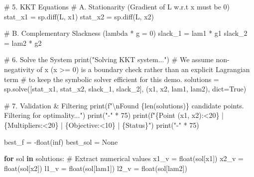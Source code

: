 \documentclass[
  letterpaper,
  DIV=11,
  numbers=noendperiod]{scrreprt}
\newenvironment{Shaded}{\begin{snugshade}}{\end{snugshade}}
\newcommand{\BuiltInTok}[1]{\textcolor[rgb]{0.00,0.23,0.31}{#1}}
\newcommand{\CharTok}[1]{\textcolor[rgb]{0.13,0.47,0.30}{#1}}
\newcommand{\CommentTok}[1]{\textcolor[rgb]{0.37,0.37,0.37}{#1}}
\newcommand{\ControlFlowTok}[1]{\textcolor[rgb]{0.00,0.23,0.31}{\textbf{#1}}}
\newcommand{\DecValTok}[1]{\textcolor[rgb]{0.68,0.00,0.00}{#1}}
\newcommand{\KeywordTok}[1]{\textcolor[rgb]{0.00,0.23,0.31}{\textbf{#1}}}
\newcommand{\NormalTok}[1]{\textcolor[rgb]{0.00,0.23,0.31}{#1}}
\newcommand{\OperatorTok}[1]{\textcolor[rgb]{0.37,0.37,0.37}{#1}}
\newcommand{\SpecialCharTok}[1]{\textcolor[rgb]{0.37,0.37,0.37}{#1}}
\newcommand{\SpecialStringTok}[1]{\textcolor[rgb]{0.13,0.47,0.30}{#1}}
\newcommand{\StringTok}[1]{\textcolor[rgb]{0.13,0.47,0.30}{#1}}
\newcommand{\VariableTok}[1]{\textcolor[rgb]{0.07,0.07,0.07}{#1}}
\begin{document}
\begin{Shaded}
\begin{Highlighting}[]
\CommentTok{\# 5. KKT Equations}
\CommentTok{\# A. Stationarity (Gradient of L w.r.t x must be 0)}
\NormalTok{stat\_x1 }\OperatorTok{=}\NormalTok{ sp.diff(L, x1)}
\NormalTok{stat\_x2 }\OperatorTok{=}\NormalTok{ sp.diff(L, x2)}

\CommentTok{\# B. Complementary Slackness (lambda * g = 0)}
\NormalTok{slack\_1 }\OperatorTok{=}\NormalTok{ lam1 }\OperatorTok{*}\NormalTok{ g1}
\NormalTok{slack\_2 }\OperatorTok{=}\NormalTok{ lam2 }\OperatorTok{*}\NormalTok{ g2}

\CommentTok{\# 6. Solve the System}
\BuiltInTok{print}\NormalTok{(}\StringTok{"Solving KKT system..."}\NormalTok{)}
\CommentTok{\# We assume non{-}negativity of x (x \textgreater{}= 0) is a boundary check rather than an explicit Lagrangian term }
\CommentTok{\# to keep the symbolic solver efficient for this demo.}
\NormalTok{solutions }\OperatorTok{=}\NormalTok{ sp.solve([stat\_x1, stat\_x2, slack\_1, slack\_2], (x1, x2, lam1, lam2), }\BuiltInTok{dict}\OperatorTok{=}\VariableTok{True}\NormalTok{)}

\CommentTok{\# 7. Validation \& Filtering}
\BuiltInTok{print}\NormalTok{(}\SpecialStringTok{f"}\CharTok{\textbackslash{}n}\SpecialStringTok{Found }\SpecialCharTok{\{}\BuiltInTok{len}\NormalTok{(solutions)}\SpecialCharTok{\}}\SpecialStringTok{ candidate points. Filtering for optimality..."}\NormalTok{)}
\BuiltInTok{print}\NormalTok{(}\StringTok{"{-}"} \OperatorTok{*} \DecValTok{75}\NormalTok{)}
\BuiltInTok{print}\NormalTok{(}\SpecialStringTok{f"}\SpecialCharTok{\{}\StringTok{\textquotesingle{}Point (x1, x2)\textquotesingle{}}\SpecialCharTok{:\textless{}20\}}\SpecialStringTok{ | }\SpecialCharTok{\{}\StringTok{\textquotesingle{}Multipliers\textquotesingle{}}\SpecialCharTok{:\textless{}20\}}\SpecialStringTok{ | }\SpecialCharTok{\{}\StringTok{\textquotesingle{}Objective\textquotesingle{}}\SpecialCharTok{:\textless{}10\}}\SpecialStringTok{ | }\SpecialCharTok{\{}\StringTok{\textquotesingle{}Status\textquotesingle{}}\SpecialCharTok{\}}\SpecialStringTok{"}\NormalTok{)}
\BuiltInTok{print}\NormalTok{(}\StringTok{"{-}"} \OperatorTok{*} \DecValTok{75}\NormalTok{)}

\NormalTok{best\_f }\OperatorTok{=} \OperatorTok{{-}}\BuiltInTok{float}\NormalTok{(}\StringTok{\textquotesingle{}inf\textquotesingle{}}\NormalTok{)}
\NormalTok{best\_sol }\OperatorTok{=} \VariableTok{None}

\ControlFlowTok{for}\NormalTok{ sol }\KeywordTok{in}\NormalTok{ solutions:}
    \CommentTok{\# Extract numerical values}
\NormalTok{    x1\_v }\OperatorTok{=} \BuiltInTok{float}\NormalTok{(sol[x1])}
\NormalTok{    x2\_v }\OperatorTok{=} \BuiltInTok{float}\NormalTok{(sol[x2])}
\NormalTok{    l1\_v }\OperatorTok{=} \BuiltInTok{float}\NormalTok{(sol[lam1])}
\NormalTok{    l2\_v }\OperatorTok{=} \BuiltInTok{float}\NormalTok{(sol[lam2])}
    

\end{Highlighting}
\end{Shaded}
\end{document}
